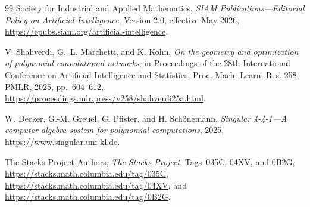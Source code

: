 \documentclass{siamonline250211}
\begin{document}
\begin{thebibliography}{99}
Society for Industrial and Applied Mathematics,
\emph{SIAM Publications---Editorial Policy on Artificial Intelligence},
Version 2.0, effective May 2026,
\url{https://epubs.siam.org/artificial-intelligence}.

V. Shahverdi, G.~L. Marchetti, and K. Kohn,
\emph{On the geometry and optimization of polynomial convolutional networks},
in Proceedings of the 28th International Conference on Artificial Intelligence
and Statistics, Proc. Mach. Learn. Res. 258, PMLR, 2025, pp.~604--612,
\url{https://proceedings.mlr.press/v258/shahverdi25a.html}.

W. Decker, G.-M. Greuel, G. Pfister, and H. Sch\"onemann,
\emph{Singular 4-4-1---A computer algebra system for polynomial computations},
2025, \url{https://www.singular.uni-kl.de}.

The Stacks Project Authors,
\emph{The Stacks Project}, Tags~035C, 04XV, and 0B2G,
\url{https://stacks.math.columbia.edu/tag/035C},
\url{https://stacks.math.columbia.edu/tag/04XV}, and
\url{https://stacks.math.columbia.edu/tag/0B2G}.

\end{thebibliography}
\end{document}
